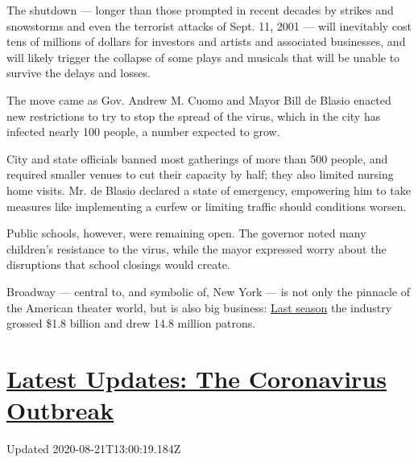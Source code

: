 The shutdown --- longer than those prompted in recent decades by strikes
and snowstorms and even the terrorist attacks of Sept. 11, 2001 --- will
inevitably cost tens of millions of dollars for investors and artists
and associated businesses, and will likely trigger the collapse of some
plays and musicals that will be unable to survive the delays and losses.

The move came as Gov. Andrew M. Cuomo and Mayor Bill de Blasio enacted
new restrictions to try to stop the spread of the virus, which in the
city has infected nearly 100 people, a number expected to grow.

City and state officials banned most gatherings of more than 500 people,
and required smaller venues to cut their capacity by half; they also
limited nursing home visits. Mr. de Blasio declared a state of
emergency, empowering him to take measures like implementing a curfew or
limiting traffic should conditions worsen.

Public schools, however, were remaining open. The governor noted many
children's resistance to the virus, while the mayor expressed worry
about the disruptions that school closings would create.

Broadway --- central to, and symbolic of, New York --- is not only the
pinnacle of the American theater world, but is also big business:
\href{https://www.nytimes3xbfgragh.onion/2019/05/29/theater/broadway-box-office.html}{Last
season} the industry grossed \$1.8 billion and drew 14.8 million
patrons.

\hypertarget{latest-updates-the-coronavirus-outbreak}{%
\section{\texorpdfstring{\href{https://www.nytimes3xbfgragh.onion/2020/08/21/world/covid-19-coronavirus.html?action=click\&pgtype=Article\&state=default\&region=MAIN_CONTENT_1\&context=storylines_live_updates}{Latest
Updates: The Coronavirus
Outbreak}}{Latest Updates: The Coronavirus Outbreak}}\label{latest-updates-the-coronavirus-outbreak}}

Updated 2020-08-21T13:00:19.184Z

